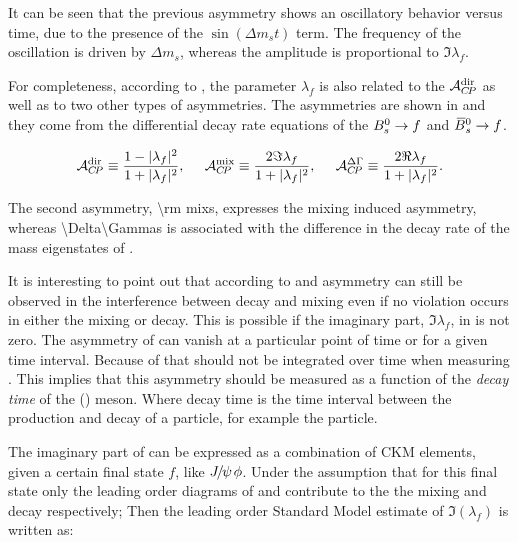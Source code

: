 \noindent It can be seen that the previous asymmetry shows an oscillatory behavior versus time, due
to the presence of the $\sin(\Delta m_s t)$ term. The frequency of the oscillation is driven by $\Delta m_s$, whereas
the amplitude is proportional to $\Im\lambda_f$.

For completeness, according to \cite{DeBruyn-thesis,jeroenThesis}, the parameter $\lambda_f$ is also related to the $\mathcal{A}_{C\!P}^{\rm dir}$ as well as to two
other types of asymmetries. The asymmetries are shown in  and they come from the differential decay rate equations of the $B^0_s\rightarrow f$
 and $\kern 0.18em\overline{\kern -0.18em B}{}^0_s\rightarrow f$.

\begin{equation}
  \centering
  \Acp{\rm dir}      \equiv \frac{ 1-|\lambda_f|^2} {1 + |\lambda_f|^2},\;\;\;\;\;
  \Acp{\rm mix}      \equiv \frac{ 2 \Im\lambda_f} {1 + |\lambda_f|^2},\;\;\;\;\;
  \Acp{\Delta\Gamma} \equiv \frac{ 2 \Re\lambda_f} {1 + |\lambda_f|^2}.
\label{cp_asym_lambda}
\end{equation}

\noindent The second asymmetry, \Acp{\rm mix}, expresses the mixing induced \CP asymmetry, whereas \Acp{\Delta\Gamma} is associated with the
difference in the decay rate of the mass eigenstates of .

It is interesting to point out that according to  and  \CP asymmetry
can still be observed in the interference between decay and
mixing even if no \CP violation occurs in either the mixing or decay. This is possible if the imaginary part,
$\Im\lambda_f$, in  is not zero. The asymmetry of  can vanish at a
particular point of time or for a given time interval. Because of that  should not
be integrated over time when measuring \phis. This implies that this asymmetry should be measured as
a function of the {\it decay time} of the \Bs (\Bsb) meson. Where decay time is the time interval between
the production and decay of a particle, for example the \Bs particle.

The imaginary part of  can be expressed as a combination of CKM elements, given a certain final state $f$, like ${J\mskip -3mu/\mskip -2mu\psi\mskip 2mu}\phi$.
Under the assumption that for this final state only the leading order diagrams of  and  contribute to the
the \BBbarSyst mixing and decay respectively; Then the leading order Standard Model estimate of $\Im(\lambda_f)$ is written as:

